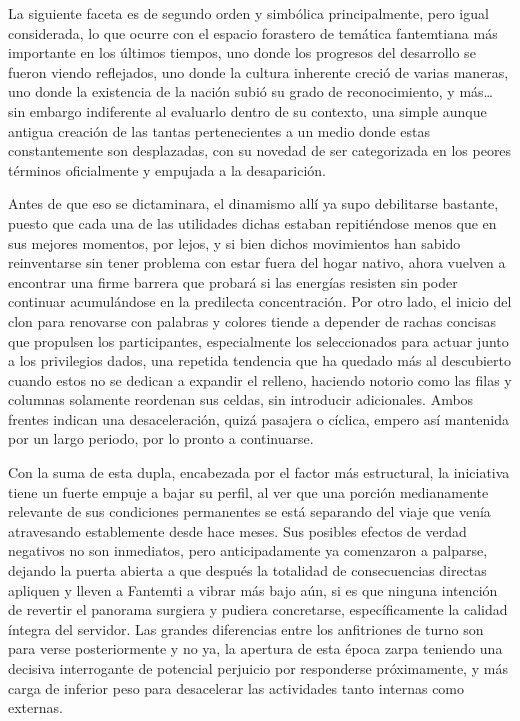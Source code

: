 \documentclass[
]{book}
\begin{document}
La siguiente faceta es de segundo orden y simbólica principalmente, pero igual considerada, lo que ocurre con el espacio forastero de temática fantemtiana más importante en los últimos tiempos, uno donde los progresos del desarrollo se fueron viendo reflejados, uno donde la cultura inherente creció de varias maneras, uno donde la existencia de la nación subió su grado de reconocimiento, y más\ldots{} sin embargo indiferente al evaluarlo dentro de su contexto, una simple aunque antigua creación de las tantas pertenecientes a un medio donde estas constantemente son desplazadas, con su novedad de ser categorizada en los peores términos oficialmente y empujada a la desaparición.

Antes de que eso se dictaminara, el dinamismo allí ya supo debilitarse bastante, puesto que cada una de las utilidades dichas estaban repitiéndose menos que en sus mejores momentos, por lejos, y si bien dichos movimientos han sabido reinventarse sin tener problema con estar fuera del hogar nativo, ahora vuelven a encontrar una firme barrera que probará si las energías resisten sin poder continuar acumulándose en la predilecta concentración. Por otro lado, el inicio del clon para renovarse con palabras y colores tiende a depender de rachas concisas que propulsen los participantes, especialmente los seleccionados para actuar junto a los privilegios dados, una repetida tendencia que ha quedado más al descubierto cuando estos no se dedican a expandir el relleno, haciendo notorio como las filas y columnas solamente reordenan sus celdas, sin introducir adicionales. Ambos frentes indican una desaceleración, quizá pasajera o cíclica, empero así mantenida por un largo periodo, por lo pronto a continuarse.

Con la suma de esta dupla, encabezada por el factor más estructural, la iniciativa tiene un fuerte empuje a bajar su perfil, al ver que una porción medianamente relevante de sus condiciones permanentes se está separando del viaje que venía atravesando establemente desde hace meses. Sus posibles efectos de verdad negativos no son inmediatos, pero anticipadamente ya comenzaron a palparse, dejando la puerta abierta a que después la totalidad de consecuencias directas apliquen y lleven a Fantemti a vibrar más bajo aún, si es que ninguna intención de revertir el panorama surgiera y pudiera concretarse, específicamente la calidad íntegra del servidor. Las grandes diferencias entre los anfitriones de turno son para verse posteriormente y no ya, la apertura de esta época zarpa teniendo una decisiva interrogante de potencial perjuicio por responderse próximamente, y más carga de inferior peso para desacelerar las actividades tanto internas como externas.
\end{document}
